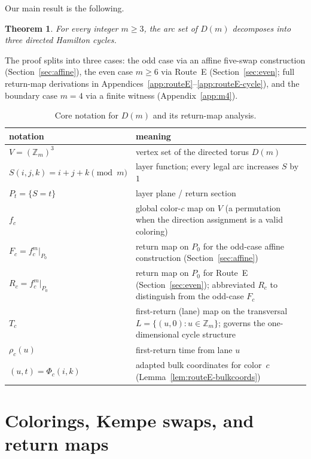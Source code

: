\documentclass[11pt]{article}
\newtheorem{theorem}{Theorem}
\begin{document}
Our main result is the following.

\begin{theorem}\label{thm:main-all}
For every integer $m\ge 3$, the arc set of $D(m)$ decomposes into three directed Hamilton cycles.
\end{theorem}

The proof splits into three cases: the odd case via an affine five-swap construction (Section~\ref{sec:affine}), the even case $m\ge 6$ via Route~E (Section~\ref{sec:even}; full return-map derivations in Appendices~\ref{app:routeE}--\ref{app:routeE-cycle}), and the boundary case $m=4$ via a finite witness (Appendix~\ref{app:m4}).

\begin{table}[t]
\centering
\footnotesize
\begin{tabularx}{\textwidth}{@{}l>{\raggedright\arraybackslash}X@{}}
\toprule
notation & meaning \\
\midrule
$V=(\mathbb Z_m)^3$ & vertex set of the directed torus $D(m)$ \\
$S(i,j,k)=i+j+k\pmod m$ & layer function; every legal arc increases $S$ by $1$ \\
$P_t=\{S=t\}$ & layer plane / return section \\
$f_c$ & global color-$c$ map on $V$ (a permutation when the direction assignment is a valid coloring) \\
$F_c=f_c^m|_{P_0}$ & return map on $P_0$ for the odd-case affine construction (Section~\ref{sec:affine}) \\
$R_c=f_c^m|_{P_0}$ & return map on $P_0$ for Route~E (Section~\ref{sec:even}); abbreviated $R_c$ to distinguish from the odd-case $F_c$ \\
$T_c$ & first-return (lane) map on the transversal $L=\{(u,0):u\in\mathbb Z_m\}$; governs the one-dimensional cycle structure \\
$\rho_c(u)$ & first-return time from lane $u$ \\
$(u,t)=\Phi_c(i,k)$ & adapted bulk coordinates for color~$c$ (Lemma~\ref{lem:routeE-bulkcoords}) \\
\bottomrule
\end{tabularx}
\caption{Core notation for $D(m)$ and its return-map analysis.}
\label{tab:notation}
\end{table}

\section{Colorings, Kempe swaps, and return maps}\label{sec:prelim}
\end{document}
